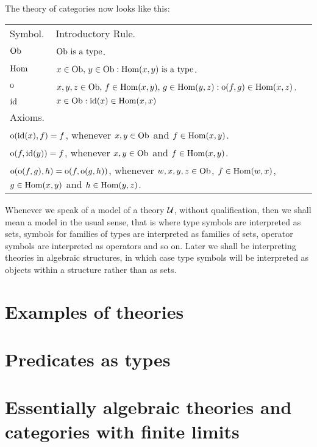 The theory of categories now looks like this:

%
\begin{tabular}{ll}
 Symbol. & Introductory Rule. \\
  $\mathrm{Ob}$ & $\mathrm{Ob} \text{ is a type}$. \\
  $\mathrm{Hom}$ & $x \in \mathrm{Ob},\, y \in \mathrm{Ob}: \mathrm{Hom}(x,y) \text{ is a type}$. \\
  $\mathrm{o}$ & $x,y,z \in \mathrm{Ob},\, f \in \mathrm{Hom}(x,y),\, g \in \mathrm{Hom}(y,z) : \mathrm{o}(f,g) \in \mathrm{Hom}(x,z)$. \\
  $\mathrm{id}$ & $x \in \mathrm{Ob} : \mathrm{id}(x) \in \mathrm{Hom}(x,x)$ \\
  \multicolumn{2}{l}{Axioms.} \\
  \multicolumn{2}{l}{$\mathrm{o}(\mathrm{id}(x),f) = f$, whenever $x,y \in \mathrm{Ob}$ and $f \in \mathrm{Hom}(x,y)$.} \\
  \multicolumn{2}{l}{$\mathrm{o}(f,\mathrm{id}(y)) = f$, whenever $x,y \in \mathrm{Ob}$ and $f \in \mathrm{Hom}(x,y)$.} \\
  \multicolumn{2}{l}{$\mathrm{o}(\mathrm{o}(f,g),h) = \mathrm{o}(f,\mathrm{o}(g,h))$, whenever $w,x,y,z \in \mathrm{Ob}$, $f \in \mathrm{Hom}(w,x)$, $g \in \mathrm{Hom}(x,y)$ and $h \in \mathrm{Hom}(y,z)$.}
\end{tabular}

Whenever we speak of a model of a theory $\mathcal{U}$, without qualification, then we shall mean a model in the usual sense, that is where type symbols are interpreted as sets, symbols for families of types are interpreted as families of sets, operator symbols are interpreted as operators and so on.
%
Later we shall be interpreting theories in algebraic structures, in which case type symbols will be interpreted as objects within a structure rather than as sets.

\section{Examples of theories} \label{sec:source-1-2}

\lipsum[1]

\section{Predicates as types} \label{sec:source-1-3}

\lipsum[2]

\section{Essentially algebraic theories and categories with finite limits} \label{sec:source-1-4}

